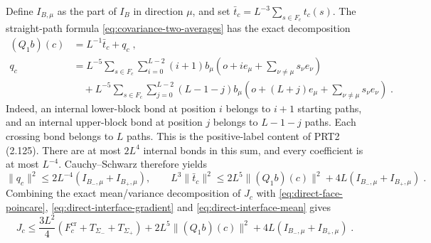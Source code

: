 \documentclass[11pt]{article}
\begin{document}
Define $I_{B,\mu}$ as the part of $I_B$ in direction $\mu$, and set $\bar t_c=L^{-3}\sum_{s\in F_c}t_c(s)$. The straight-path formula \eqref{eq:covariance-two-averages} has the exact decomposition
\begin{equation}\label{eq:direct-interface-average}
    \begin{aligned}
        (Q_1b)(c)&=L^{-1}\bar t_c+q_c\;,\\
        q_c&=L^{-5}\sum_{s\in F_c}
                \sum_{i=0}^{L-2}(i+1)
                    b_\mu\left(o+ie_\mu+
                        \sum_{\nu\ne \mu}s_\nu e_\nu\right)\\
            &\quad+L^{-5}\sum_{s\in F_c}\sum_{j=0}^{L-2}(L-1-j)
                    b_\mu\left(o+(L+j)e_\mu+
                        \sum_{\nu\ne \mu}s_\nu e_\nu\right)
            \;.
    \end{aligned}
\end{equation}
Indeed, an internal lower-block bond at position $i$ belongs to $i+1$ starting paths, and an internal upper-block bond at position $j$ belongs to $L-1-j$ paths. Each crossing bond belongs to $L$ paths. This is the positive-label content of PRT2 (2.125). There are at most $2L^4$ internal bonds in this sum, and every coefficient is at most $L^{-4}$. Cauchy--Schwarz therefore yields
\begin{equation}\label{eq:direct-interface-mean}
    \|q_c\|^2\leq 2L^{-4}(I_{B_-,\mu}+I_{B_+,\mu}),
    \qquad
    L^3\|\bar t_c\|^2
        \leq 2L^5\|(Q_1b)(c)\|^2
            +4L(I_{B_-,\mu}+I_{B_+,\mu})\;.
\end{equation}
Combining the exact mean/variance decomposition of $J_c$ with \eqref{eq:direct-face-poincare}, \eqref{eq:direct-interface-gradient} and \eqref{eq:direct-interface-mean} gives
\begin{equation}\label{eq:direct-interface-bound}
    J_c\leq \frac{3L^2}{4}
        (F_c^{\mathrm{cr}}+T_{\Sigma_-}+T_{\Sigma_+})
        +2L^5\|(Q_1b)(c)\|^2
        +4L(I_{B_-,\mu}+I_{B_+,\mu})\;.
\end{equation}
\end{document}
